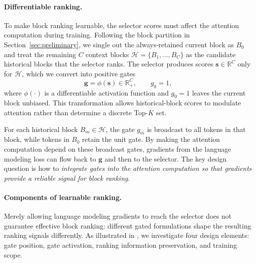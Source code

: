 \paragraph{Differentiable ranking.}
To make block ranking learnable, the selector scores must affect the attention computation during training.
Following the block partition in Section~\ref{sec:preliminary}, we single out the always-retained current block as $B_0$ and treat the remaining $C$ context blocks $\mathcal{H}=\{B_1,\ldots,B_C\}$ as the candidate historical blocks that the selector ranks.
The selector produces scores $\mathbf{s}\in\mathbb{R}^{C}$ only for $\mathcal{H}$, which we convert into positive gates
\begin{equation}
    \mathbf{g} = \phi(\mathbf{s})\in\mathbb{R}_{+}^{C},
    \qquad g_0=1,
    \label{eq:general_gate}
\end{equation}
where $\phi(\cdot)$ is a differentiable activation function and $g_0=1$ leaves the current block unbiased.
This transformation allows historical-block scores to modulate attention rather than determine a discrete Top-$K$ set.


For each historical block $B_m\in\mathcal{H}$, the gate $g_m$ is broadcast to all tokens in that block, while tokens in $B_0$ retain the unit gate.
By making the attention computation depend on these broadcast gates, gradients from the language modeling loss can flow back to $\mathbf{g}$ and then to the selector.
The key design question is how to \textit{integrate gates into the attention computation so that gradients provide a reliable signal for block ranking}.


\paragraph{Components of learnable ranking.}
Merely allowing language modeling gradients to reach the selector does not guarantee effective block ranking: different gated formulations shape the resulting ranking signals differently.
As illustrated in , we investigate four design elements: gate position, gate activation, ranking information preservation, and training scope.

